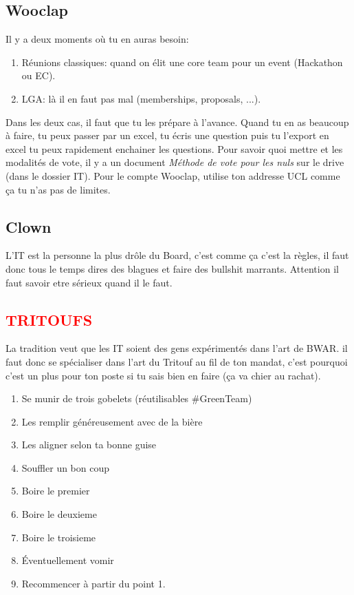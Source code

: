 \documentclass[12pt]{article}
\begin{document}
	\subsection{Wooclap}
		Il y a deux moments où tu en auras besoin:
		\begin{enumerate}
			\item Réunions classiques: quand on élit une core team pour un event (Hackathon ou EC).
			\item LGA: là il en faut pas mal (memberships, proposals, ...).
		\end{enumerate}
		Dans les deux cas, il faut que tu les prépare à l'avance. Quand tu en as beaucoup à faire, tu peux passer par un excel, tu écris une question puis tu l'export en excel tu peux rapidement enchainer les questions.
		Pour savoir quoi mettre et les modalités de vote, il y a un document \textit{Méthode de vote pour les nuls} sur le drive (dans le dossier IT).
		Pour le compte Wooclap, utilise ton addresse UCL comme ça tu n'as pas de limites.
		
	\subsection{Clown}
		L'IT est la personne la plus drôle du Board, c'est comme ça c'est la règles, il faut donc tous le temps dires des blagues et faire des bullshit marrants. Attention il faut savoir etre sérieux quand il le faut.
	
	\subsection{\textcolor{red}{TRITOUFS}}
		
		La tradition veut que les IT soient des gens expérimentés dans l’art de BWAR. il faut donc se spécialiser dans l’art du Tritouf au fil de ton mandat, c’est pourquoi c’est un plus pour ton poste si tu sais bien en faire (ça va chier au rachat). 
		
		\begin{enumerate}
			\item Se munir de trois gobelets (réutilisables \#GreenTeam) 
			\item Les remplir généreusement avec de la bière
			\item Les aligner selon ta bonne guise 
			\item Souffler un bon coup 
			\item Boire le premier 
			\item Boire le deuxieme
			\item Boire le troisieme
			\item Éventuellement vomir
			\item Recommencer à partir du point 1. 

		\end{enumerate}
		
\end{document}

